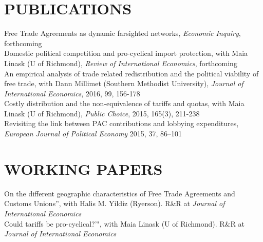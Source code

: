 \documentclass[11pt]{res}
\begin{document}
\begin{resume}
\section{PUBLICATIONS}\vspace{1.5mm}
{ Free Trade Agreements as dynamic farsighted networks}, \emph{Economic Inquiry}, forthcoming\vspace{1.5mm}\\
{Domestic political competition and pro-cyclical import protection}, with Maia Linask (U of Richmond), \emph{Review of International Economics}, forthcoming\vspace{1.5mm}\\
{An empirical analysis of trade related redistribution and the political viability of free trade}, with Dann Millimet (Southern Methodist University), \emph{Journal of International Economics}, 2016, 99, 156-178 \vspace{1.5mm}\\
{Costly distribution and the non-equivalence of tariffs and quotas}, with Maia Linask (U of Richmond), \emph{Public Choice}, 2015, 165(3), 211-238 \vspace{1.5mm}\\
{Revisiting the link between PAC contributions and lobbying expenditures, \emph{European Journal of Political Economy}} 2015, 37, 86--101 \vspace{1.5mm}\\

\section{WORKING PAPERS}\vspace{1.5mm}
{On the different geographic characteristics of Free Trade Agreements and Customs Unions''}, with Halis M. Yildiz (Ryerson). R\&R at \emph{Journal of International Economics}\vspace{1.5mm}\\
{Could tariffs be pro-cyclical?'"}, with Maia Linask (U of Richmond). R\&R at \emph{Journal of International Economics}\vspace{1.5mm}\\



\end{resume}
\end{document}
